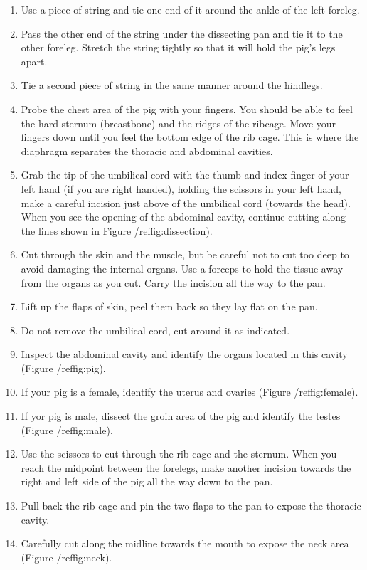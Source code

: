 \begin{enumerate}
\item
  Use a piece of string and tie one end of it around the ankle of the left foreleg.
\item
  Pass the other end of the string under the dissecting pan and tie it to the other foreleg. Stretch the string tightly so that it will hold the pig's legs apart.
\item
  Tie a second piece of string in the same manner around the hindlegs.
\item
  Probe the chest area of the pig with your fingers. You should be able to feel the hard sternum (breastbone) and the ridges of the ribcage. Move your fingers down until you feel the bottom edge of the rib cage. This is where the diaphragm separates the thoracic and abdominal cavities.
\item
        Grab the tip of the umbilical cord with the thumb and index finger of your left hand (if you are right handed), holding the scissors in your left hand, make a careful incision just above of the umbilical cord (towards the head). When you see the opening of the abdominal cavity, continue cutting along the lines shown in Figure /ref{fig:dissection}).
\item
  Cut through the skin and the muscle, but be careful not to cut too deep to avoid damaging the internal organs. Use a forceps to hold the tissue away from the organs as you cut. Carry the incision all the way to the pan.
\item
  Lift up the flaps of skin, peel them back so they lay flat on the pan.
\item
  Do not remove the umbilical cord, cut around it as indicated.
\item
  Inspect the abdominal cavity and identify the organs located in this cavity (Figure /ref{fig:pig}).
\item
  If your pig is a female, identify the uterus and ovaries (Figure /ref{fig:female}).
\item
  If yor pig is male, dissect the groin area of the pig and identify the testes (Figure /ref{fig:male}).
\item
  Use the scissors to cut through the rib cage and the sternum. When you reach the midpoint between the forelegs, make another incision towards the right and left side of the pig all the way down to the pan.
\item
  Pull back the rib cage and pin the two flaps to the pan to expose the thoracic cavity.
\item
  Carefully cut along the midline towards the mouth to expose the neck area (Figure /ref{fig:neck}).

\end{enumerate}

